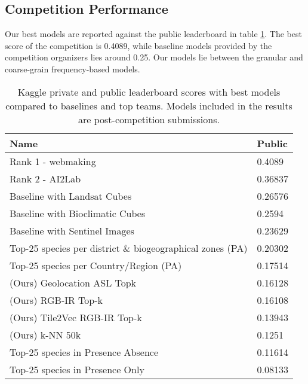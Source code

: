 \subsection{Competition Performance}

Our best models are reported against the public leaderboard in table \ref{tab:leaderboard}.
The best score of the competition is 0.4089, while baseline models provided by the competition organizers lies around 0.25.
Our models lie between the granular and coarse-grain frequency-based models.

\begin{table}[h]
    \caption{
        Kaggle private and public leaderboard scores with best models compared to baselines and top teams.
        Models included in the results are post-competition submissions.
    }
    \label{tab:leaderboard}
    \begin{tabular}{|l|l|}
    \hline
    \textbf{Name}                                             & \textbf{Public} \\ \hline
    Rank 1 - webmaking                                        & 0.4089          \\ \hline
    Rank 2 - AI2Lab                                           & 0.36837         \\ \hline
    Baseline with Landsat Cubes                               & 0.26576         \\ \hline
    Baseline with Bioclimatic Cubes                           & 0.2594          \\ \hline
    Baseline with Sentinel Images                             & 0.23629         \\ \hline
    Top-25 species per district \& biogeographical zones (PA) & 0.20302         \\ \hline
    Top-25 species per Country/Region (PA)                    & 0.17514         \\ \hline
    (Ours) Geolocation ASL Topk                                              & 0.16128         \\ \hline
    (Ours) RGB-IR Top-k                                             & 0.16108         \\ \hline
    (Ours) Tile2Vec RGB-IR Top-k                                             & 0.13943         \\ \hline
    (Ours) k-NN 50k                                                   & 0.1251          \\ \hline
    Top-25 species in Presence Absence                        & 0.11614         \\ \hline
    Top-25 species in Presence Only                           & 0.08133         \\ \hline
    \end{tabular}%
\end{table}

